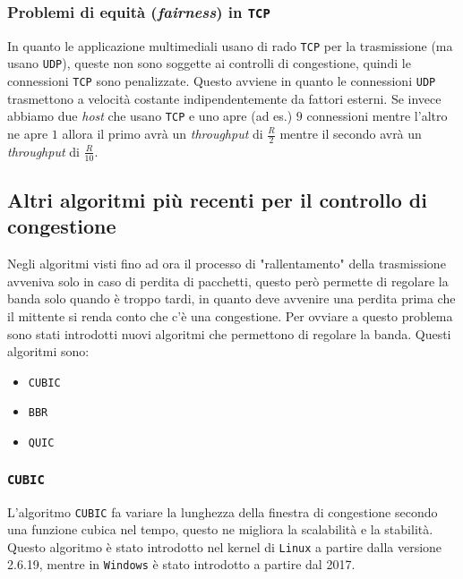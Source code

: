         \subsubsection{Problemi di equità (\textit{fairness}) in \texttt{TCP}}
            In quanto le applicazione multimediali usano di rado \texttt{TCP} per la trasmissione (ma usano \texttt{UDP}), queste non sono soggette ai controlli di congestione, quindi le connessioni \texttt{TCP} sono penalizzate. Questo avviene in quanto le connessioni \texttt{UDP} trasmettono a velocità costante indipendentemente da fattori esterni.\newline
            Se invece abbiamo due \textit{host} che usano \texttt{TCP} e uno apre (ad es.) $ 9 $ connessioni mentre l'altro ne apre $ 1 $ allora il primo avrà un \textit{throughput} di $ \frac{R}2 $ mentre il secondo avrà un \textit{throughput} di $ \frac{R} {10} $.
    \subsection{Altri algoritmi più recenti per il controllo di congestione}
        Negli algoritmi visti fino ad ora il processo di "rallentamento" della trasmissione avveniva solo in caso di perdita di pacchetti, questo però permette di regolare la banda solo quando è troppo tardi, in quanto deve avvenire una perdita prima che il mittente si renda conto che c'è una congestione. Per ovviare a questo problema sono stati introdotti nuovi algoritmi che permettono di regolare la banda. Questi algoritmi sono: \begin{itemize}
            \item \texttt{CUBIC}
            \item \texttt{BBR}
            \item \texttt{QUIC}
        \end{itemize}
        \subsubsection{\texttt{CUBIC}}
            L'algoritmo \texttt{CUBIC} fa variare la lunghezza della finestra di congestione secondo una funzione cubica nel tempo, questo ne migliora la scalabilità e la stabilità. Questo algoritmo è stato introdotto nel kernel di \texttt{Linux} a partire dalla versione 2.6.19, mentre in \texttt{Windows} è stato introdotto a partire dal 2017.
